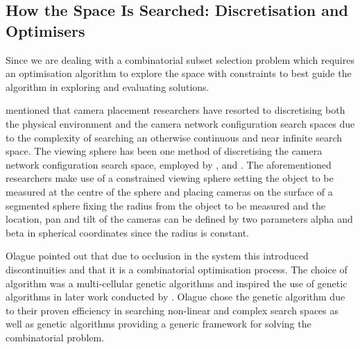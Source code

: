 \subsection{How the Space Is Searched: Discretisation and Optimisers}
Since we are dealing with a combinatorial subset selection problem which requires an optimisation algorithm to explore the space with constraints to best guide the algorithm in exploring and evaluating solutions.

\citet{zhao2013approximate} mentioned that camera placement researchers have resorted to discretising both the physical environment and the camera network configuration search spaces due to the complexity of searching an otherwise continuous and near infinite search space. The viewing sphere has been one method of discretising the camera network configuration search space, employed by \citet{mason1995expert}, \cite{olague2002optimal} and \cite{rahimian2016optimal}. The aforementioned researchers make use of a constrained viewing sphere setting the object to be measured at the centre of the sphere and placing cameras on the surface of a segmented sphere fixing the radius from the object to be measured and the location, pan and tilt of the cameras can be defined by two parameters alpha and beta in spherical coordinates since the radius is constant.


Olague pointed out that due to occlusion in the system this introduced discontinuities and that it is a combinatorial optimisation process. The choice of algorithm was a multi-cellular genetic algorithms and inspired the use of genetic algorithms in later work conducted by \citet{aissaoui2018designing}. Olague chose the genetic algorithm due to their proven efficiency in searching non-linear and complex search spaces as well as genetic algorithms providing a generic framework for solving the combinatorial problem.

